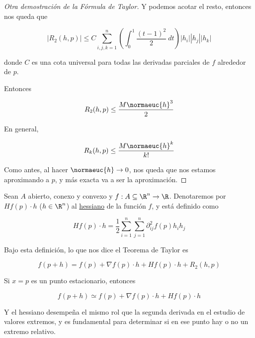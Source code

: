 \begin{proof}[Otra demostración de la Fórmula de Taylor]
    Y podemos acotar el resto, entonces nos queda que
    
    \[
    |R_2(h, p)| \leq C \sum_{i,j,k=1}^n \left( \int_0^1 \dfrac{(t-1)^2}{2}~dt \right)|h_i||h_j||h_k|
    \]
    
    \noindent donde $C$ es una cota universal para todas las derivadas parciales de $f$ alrededor de $p$.
    
    Entonces
    
    \[
    R_2(h, p) \leq \dfrac{M \normaeuc{h}^3}{2}
    \]
    
    En general,
    
    \[
    R_k(h, p) \leq \dfrac{M \normaeuc{h}^k}{k!}
    \]
    
    Como antes, al hacer $\normaeuc{h} \to 0$, nos queda que nos estamos aproximando a $p$, y más exacta va a ser la aproximación.
\end{proof}

\begin{defn}
    Sean $A$ abierto, conexo y convexo y $f: A \subseteq \R^n \rightarrow \R$. Denotaremos por $H f(p) \cdot h$ ($h \in \R^n$) al \ul{hessiano} de la función $f$, y está definido como
    
    \[
    H f(p) \cdot h = \frac{1}{2} \sum_{i=1}^n\sum_{j=1}^n \partial_{ij}^2 f(p) h_ih_j
    \]
\end{defn}

Bajo esta definición, lo que nos dice el Teorema de Taylor es

\[
f(p + h) = f(p) + \nabla f(p) \cdot h + H f(p) \cdot h + R_2(h, p)
\]

Si $x = p$ es un punto estacionario, entonces

\[
f(p + h) \simeq f(p) + \nabla f(p) \cdot h + H f(p) \cdot h
\]

Y el hessiano desempeña el mismo rol que la segunda derivada en el estudio de valores extremos, y es fundamental para determinar si en ese punto hay o no un extremo relativo.